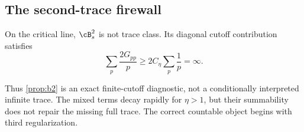 \subsection{The second-trace firewall}

\begin{proposition}
\label{prop:no-b2}
On the critical line, $\cB_s^2$ is not trace class.  Its diagonal
cutoff contribution satisfies
\[
 \sum_p\frac{2G_{pp}}p
 \ge2C_\eta\sum_p\frac1p=\infty.
\]
\end{proposition}

Thus \cref{prop:b2} is an exact finite-cutoff diagnostic, not a
conditionally interpreted infinite trace.  The mixed terms decay
rapidly for $\eta>1$, but their summability does not repair the missing
full trace.  The correct countable object begins with third
regularization.
